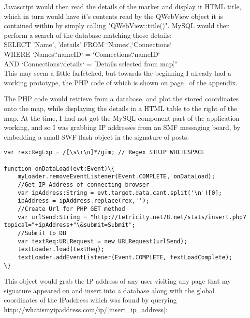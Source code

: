 Javascript would then read the details of the marker and display it HTML title, which in turn would have it's contents read by the QWebView object it is contained within by simply calling "QWebView::title()". MySQL would then perform a search of the database matching those details:\\

 SELECT 'Name', 'details' FROM `Names`,`Connections`\\
\tab WHERE `Names`.`nameID` = `Connections`.`nameID`\\
\tab AND `Connections`.`details` = [Details selected from map]"\\

This may seem a little farfetched, but towards the beginning I already had a working prototype, the PHP code of which is shown on page~\pageref{gmaps} of the appendix.

The PHP code would retrieve from a database, and plot the stored coordinates onto the map, while displaying the details in a HTML table to the right of the map. At the time, I had not got the MySQL component part of the application working, and so I was grabbing IP addresses from an SMF messaging board, by embedding a small SWF flash object in the signature of posts:

\begin{lstlisting}[title=\bf Snippet from counter.fla]
var rex:RegExp = /[\s\r\n]*/gim; // Regex STRIP WHITESPACE

function onDataLoad(evt:Event)\{
	myLoader.removeEventListener(Event.COMPLETE, onDataLoad);
	//Get IP Address of connecting browser
	var ipAddress:String = evt.target.data.cant.split('\n')[0];
	ipAddress = ipAddress.replace(rex,'');
	//Create Url for PHP GET method
	var urlSend:String = "http://tetricity.net78.net/stats/insert.php?topical="+ipAddress+"\&submit=Submit";
	//Submit to DB
	var textReq:URLRequest = new URLRequest(urlSend);
	textLoader.load(textReq);
	textLoader.addEventListener(Event.COMPLETE, textLoadComplete);
\}
\end{lstlisting}
This object would grab the IP address of any user visiting any page that my signature appeared on and insert into a database along with the global coordinates of the IPaddress which was found by querying http://whatismyipaddress.com/ip/[insert\_ip\_address]:

